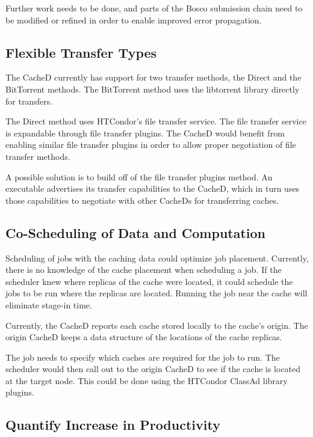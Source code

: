 Further work needs to be done, and parts of the Bosco submission chain need to be modified or refined in order to enable improved error propagation.

\subsection{Flexible Transfer Types}

The CacheD currently has support for two transfer methods, the Direct and the BitTorrent methods.  The BitTorrent method uses the libtorrent library directly for transfers.

The Direct method uses HTCondor's file transfer service.  The file transfer service is expandable through file transfer plugins.  The CacheD would benefit from enabling similar file transfer plugins in order to allow proper negotiation of file transfer methods.

A possible solution is to build off of the file transfer plugins method.  An executable advertises its transfer capabilities to the CacheD, which in turn uses those capabilities to negotiate with other CacheDs for transferring caches.


\subsection{Co-Scheduling of Data and Computation}

Scheduling of jobs with the caching data could optimize job placement.  Currently, there is no knowledge of the cache placement when scheduling a job.  If the scheduler knew where replicas of the cache were located, it could schedule the jobs to be run where the replicas are located.  Running the job near the cache will eliminate stage-in time.

Currently, the CacheD reports each cache stored locally to the cache's origin. The origin CacheD keeps a data structure of the locations of the cache replicas.

The job needs to specify which caches are required for the job to run.  The scheduler would then call out to the origin CacheD to see if the cache is located at the target node.  This could be done using the HTCondor ClassAd library plugins.


\subsection{Quantify Increase in Productivity}

